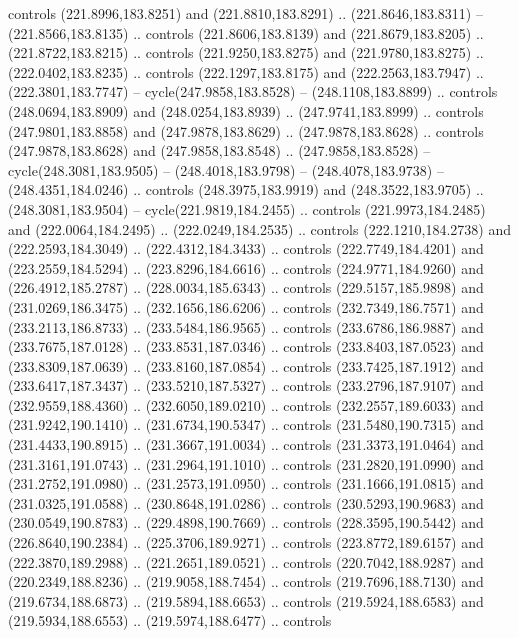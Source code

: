 \begin{scope}[cm={{1.25,0.0,0.0,-1.25,(0.0,442.91375)}}]
    controls (221.8996,183.8251) and (221.8810,183.8291) .. (221.8646,183.8311) --
    (221.8566,183.8135) .. controls (221.8606,183.8139) and (221.8679,183.8205) ..
    (221.8722,183.8215) .. controls (221.9250,183.8275) and (221.9780,183.8275) ..
    (222.0402,183.8235) .. controls (222.1297,183.8175) and (222.2563,183.7947) ..
    (222.3801,183.7747) -- cycle(247.9858,183.8528) -- (248.1108,183.8899) ..
    controls (248.0694,183.8909) and (248.0254,183.8939) .. (247.9741,183.8999) ..
    controls (247.9801,183.8858) and (247.9878,183.8629) .. (247.9878,183.8628) ..
    controls (247.9878,183.8628) and (247.9858,183.8548) .. (247.9858,183.8528) --
    cycle(248.3081,183.9505) -- (248.4018,183.9798) -- (248.4078,183.9738) --
    (248.4351,184.0246) .. controls (248.3975,183.9919) and (248.3522,183.9705) ..
    (248.3081,183.9504) -- cycle(221.9819,184.2455) .. controls
    (221.9973,184.2485) and (222.0064,184.2495) .. (222.0249,184.2535) .. controls
    (222.1210,184.2738) and (222.2593,184.3049) .. (222.4312,184.3433) .. controls
    (222.7749,184.4201) and (223.2559,184.5294) .. (223.8296,184.6616) .. controls
    (224.9771,184.9260) and (226.4912,185.2787) .. (228.0034,185.6343) .. controls
    (229.5157,185.9898) and (231.0269,186.3475) .. (232.1656,186.6206) .. controls
    (232.7349,186.7571) and (233.2113,186.8733) .. (233.5484,186.9565) .. controls
    (233.6786,186.9887) and (233.7675,187.0128) .. (233.8531,187.0346) .. controls
    (233.8403,187.0523) and (233.8309,187.0639) .. (233.8160,187.0854) .. controls
    (233.7425,187.1912) and (233.6417,187.3437) .. (233.5210,187.5327) .. controls
    (233.2796,187.9107) and (232.9559,188.4360) .. (232.6050,189.0210) .. controls
    (232.2557,189.6033) and (231.9242,190.1410) .. (231.6734,190.5347) .. controls
    (231.5480,190.7315) and (231.4433,190.8915) .. (231.3667,191.0034) .. controls
    (231.3373,191.0464) and (231.3161,191.0743) .. (231.2964,191.1010) .. controls
    (231.2820,191.0990) and (231.2752,191.0980) .. (231.2573,191.0950) .. controls
    (231.1666,191.0815) and (231.0325,191.0588) .. (230.8648,191.0286) .. controls
    (230.5293,190.9683) and (230.0549,190.8783) .. (229.4898,190.7669) .. controls
    (228.3595,190.5442) and (226.8640,190.2384) .. (225.3706,189.9271) .. controls
    (223.8772,189.6157) and (222.3870,189.2988) .. (221.2651,189.0521) .. controls
    (220.7042,188.9287) and (220.2349,188.8236) .. (219.9058,188.7454) .. controls
    (219.7696,188.7130) and (219.6734,188.6873) .. (219.5894,188.6653) .. controls
    (219.5924,188.6583) and (219.5934,188.6553) .. (219.5974,188.6477) .. controls

\end{scope}
